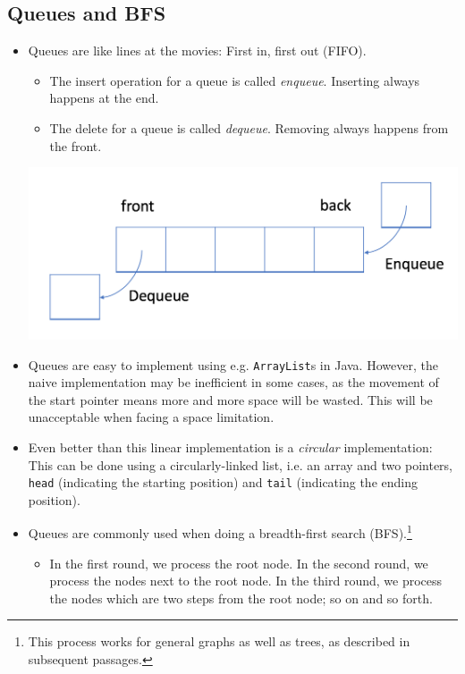 \documentclass[12pt]{article}
\begin{document}
	\subsection*{Queues and BFS}
	\label{sec:Queue}
	\begin{itemize}
		\item Queues are like lines at the movies: First in, first out (FIFO).
		
		\begin{itemize}
			\item The insert operation for a queue is called \emph{enqueue}. Inserting always happens at the end.
			\item The delete for a queue is called \emph{dequeue}. Removing always happens from the front.
		\end{itemize}
		\begin{center}
			\includegraphics[scale=0.5]{img/EnDeQueue.png}
		\end{center}
	
		\item Queues are easy to implement using e.g. \texttt{ArrayList}s in Java. However, the naive implementation may be inefficient in some cases, as the movement of the start pointer means more and more space will be wasted. This will be unacceptable when facing a space limitation.
		
		\item Even better than this linear implementation is a \emph{circular} implementation: This can be done using a circularly-linked list, i.e. an array and two pointers, \texttt{head} (indicating the starting position) and \texttt{tail} (indicating the ending position).
		
		\item Queues are commonly used when doing a breadth-first search (BFS).\footnote{This process works for general graphs as well as trees, as described in subsequent passages.}
		
		\begin{itemize}
			\item In the first round, we process the root node. In the second round, we process the nodes next to the root node. In the third round, we process the nodes which are two steps from the root node; so on and so forth.
			

\end{itemize}
\end{itemize}
\end{document}

